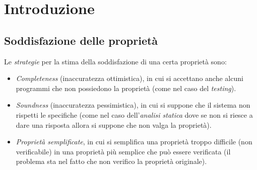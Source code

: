 \documentclass[a4paper,oneside,titlepage]{book}
\begin{document}
	
\begin{frontespizio}
\end{frontespizio}

\frontmatter
{
  \hypersetup{linkcolor=black}
  \tableofcontents
}

\mainmatter
\chapter{Introduzione}

\section{Soddisfazione delle proprietà} %
Le \textit{strategie} per la stima della soddisfazione di una certa proprietà sono:
\begin{itemize}
    \item \textit{Completeness} (inaccuratezza ottimistica), in cui si accettano anche alcuni programmi che non possiedono la proprietà (come nel caso del \textit{testing}).
    \item \textit{Soundness} (inaccuratezza pessimistica), in cui si suppone che il sistema non rispetti le specifiche (come nel caso dell'\textit{analisi statica} dove se non si riesce a dare una risposta allora si suppone che non valga la proprietà).
    \item \textit{Proprietà semplificate}, in cui si semplifica una proprietà troppo difficile (non verificabile) in una proprietà più semplice che può essere verificata (il problema sta nel fatto che non verifico la proprietà originale).
\end{itemize}
\end{document}

